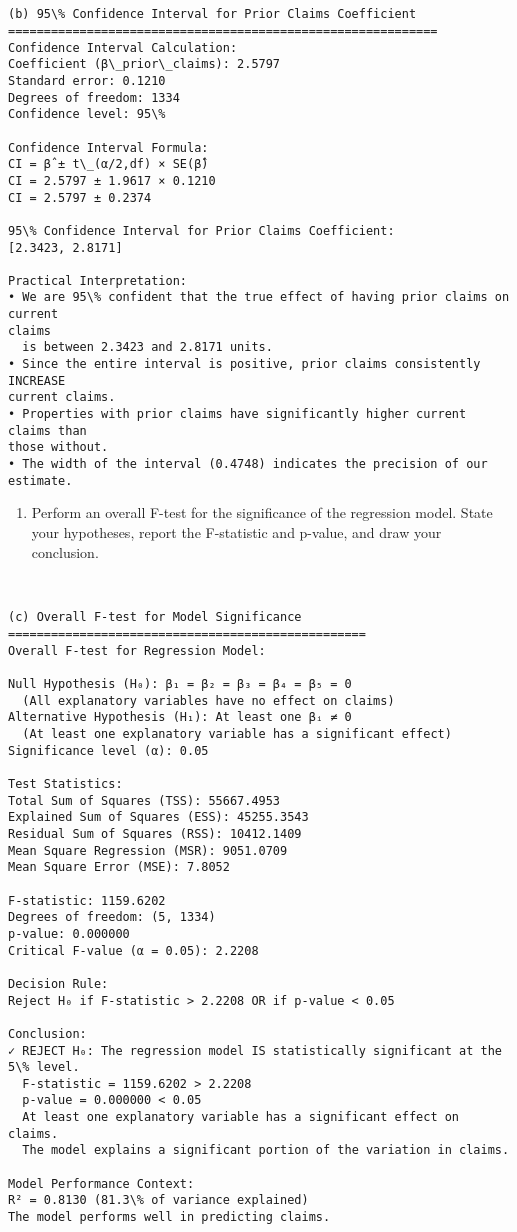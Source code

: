 \documentclass[8pt, twocolumn]{extarticle}
\providecommand{\tightlist}{%
      \setlength{\itemsep}{0pt}\setlength{\parskip}{0pt}}
\begin{document}
    \begin{Verbatim}[commandchars=\\\{\}]


(b) 95\% Confidence Interval for Prior Claims Coefficient
============================================================
Confidence Interval Calculation:
Coefficient (β\_prior\_claims): 2.5797
Standard error: 0.1210
Degrees of freedom: 1334
Confidence level: 95\%

Confidence Interval Formula:
CI = β̂ ± t\_(α/2,df) × SE(β̂)
CI = 2.5797 ± 1.9617 × 0.1210
CI = 2.5797 ± 0.2374

95\% Confidence Interval for Prior Claims Coefficient:
[2.3423, 2.8171]

Practical Interpretation:
• We are 95\% confident that the true effect of having prior claims on current
claims
  is between 2.3423 and 2.8171 units.
• Since the entire interval is positive, prior claims consistently INCREASE
current claims.
• Properties with prior claims have significantly higher current claims than
those without.
• The width of the interval (0.4748) indicates the precision of our estimate.
    \end{Verbatim}

    \begin{enumerate}
\def\labelenumi{(\alph{enumi})}
\setcounter{enumi}{2}
\tightlist
\item
  Perform an overall F-test for the significance of the regression
  model. State your hypotheses, report the F-statistic and p-value, and
  draw your conclusion.
\end{enumerate}

    \begin{Verbatim}[commandchars=\\\{\}]


(c) Overall F-test for Model Significance
==================================================
Overall F-test for Regression Model:

Null Hypothesis (H₀): β₁ = β₂ = β₃ = β₄ = β₅ = 0
  (All explanatory variables have no effect on claims)
Alternative Hypothesis (H₁): At least one βᵢ ≠ 0
  (At least one explanatory variable has a significant effect)
Significance level (α): 0.05

Test Statistics:
Total Sum of Squares (TSS): 55667.4953
Explained Sum of Squares (ESS): 45255.3543
Residual Sum of Squares (RSS): 10412.1409
Mean Square Regression (MSR): 9051.0709
Mean Square Error (MSE): 7.8052

F-statistic: 1159.6202
Degrees of freedom: (5, 1334)
p-value: 0.000000
Critical F-value (α = 0.05): 2.2208

Decision Rule:
Reject H₀ if F-statistic > 2.2208 OR if p-value < 0.05

Conclusion:
✓ REJECT H₀: The regression model IS statistically significant at the 5\% level.
  F-statistic = 1159.6202 > 2.2208
  p-value = 0.000000 < 0.05
  At least one explanatory variable has a significant effect on claims.
  The model explains a significant portion of the variation in claims.

Model Performance Context:
R² = 0.8130 (81.3\% of variance explained)
The model performs well in predicting claims.
    \end{Verbatim}
\end{document}
